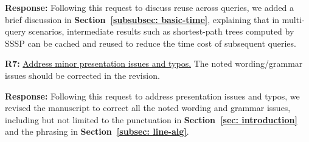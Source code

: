 \textbf{Response:} Following this request to discuss reuse across queries, we added a brief discussion in \textbf{Section~\ref{subsubsec: basic-time}}, explaining that in multi-query scenarios, intermediate results such as shortest-path trees computed by SSSP can be cached and reused to reduce the time cost of subsequent queries.

\textbf{R7:} \uline{Address minor presentation issues and typos.} The noted wording/grammar issues should be corrected in the revision.

\textbf{Response:} Following this request to address presentation issues and typos, we revised the manuscript to correct all the noted wording and grammar issues, including but not limited to the punctuation in \textbf{Section~\ref{sec: introduction}} and the phrasing in \textbf{Section~\ref{subsec: line-alg}}.